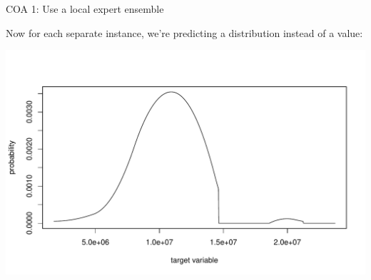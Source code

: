 \documentclass[ignorenonframetext,]{beamer}
\begin{document}
\begin{frame}[fragile]{COA 1: Use a local expert ensemble}

Now for each separate instance, we're predicting a distribution instead
of a value:

\footnotesize
\includegraphics{presentation_files/figure-beamer/unnamed-chunk-14-1.pdf}


\end{frame}
\end{document}
